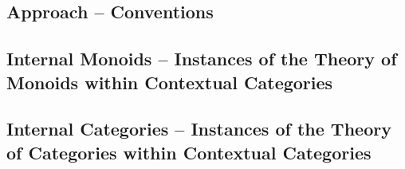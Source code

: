 \documentclass[10pt,a4paper]{article}
\theoremstyle{remark}
\begin{document}
\subsection{Approach -- Conventions}


\subsection{Internal Monoids -- Instances of the Theory of Monoids within Contextual Categories}
\label{monoidsinstanceexample} 
 


\subsection{Internal Categories -- Instances of the Theory of Categories within Contextual Categories}
\label{categoriesinstanceexample}


% 


\end{document}
